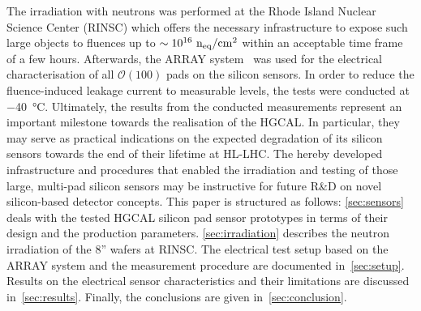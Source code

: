The irradiation with neutrons was performed at the Rhode Island Nuclear Science Center (RINSC) which offers the necessary infrastructure to expose such large objects to fluences up to  $\sim 10^{16}~\mathrm{n_{eq}}/\mathrm{cm}^{2}$ within an acceptable time frame of a few hours.
Afterwards, the ARRAY system~\cite{pitters:array2019} was used for the electrical characterisation of all $\mathcal{O}(100)$ pads on the silicon sensors.
In order to reduce the fluence-induced leakage current to measurable levels, the tests were conducted at \SI{-40}{\celsius}.
Ultimately, the results from the conducted measurements represent an important milestone towards the realisation of the HGCAL.
In particular, they may serve as practical indications on the expected degradation of its silicon sensors towards the end of their lifetime at HL-LHC. 
The hereby developed infrastructure and procedures that enabled the irradiation and testing of those large, multi-pad silicon sensors may be instructive for future R$\&$D on novel silicon-based detector concepts.\newline
This paper is structured as follows:
\ref{sec:sensors} deals with the tested HGCAL silicon pad sensor prototypes in terms of their design and the production parameters.
\ref{sec:irradiation} describes the neutron irradiation of the 8'' wafers at RINSC. 
The electrical test setup based on the ARRAY system and the measurement procedure are documented in~\ref{sec:setup}.
Results on the electrical sensor characteristics and their limitations are discussed in~\ref{sec:results}.
Finally, the conclusions are given in~\ref{sec:conclusion}.